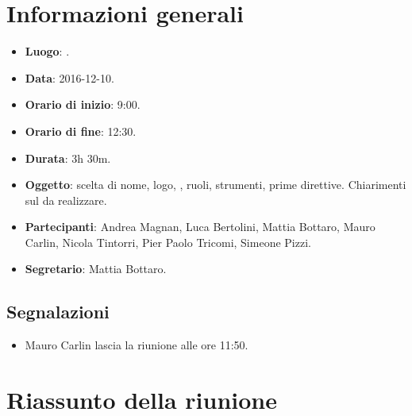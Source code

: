 \documentclass[a4paper,titlepage]{article}
\begin{document}
\maketitle
\begin{diario}
\end{diario}
\newpage
\tableofcontents

\newpage
\section{Informazioni generali}
\label{sec:Informazioni}

\begin{itemize}
  \item \textbf{Luogo}: .
  \item \textbf{Data}: 2016-12-10.
  \item \textbf{Orario di inizio}: 9:00.
  \item \textbf{Orario di fine}: 12:30.
  \item \textbf{Durata}: 3h 30m.
  \item \textbf{Oggetto}: scelta di nome, logo, , ruoli, strumenti, prime direttive. Chiarimenti sul  da realizzare. 
  \item \textbf{Partecipanti}: Andrea Magnan, Luca Bertolini, Mattia Bottaro, Mauro Carlin, Nicola Tintorri, Pier Paolo Tricomi, Simeone Pizzi.
  \item \textbf{Segretario}: Mattia Bottaro.
  
\end{itemize}
\subsection{Segnalazioni}
\begin{itemize}
 \item Mauro Carlin lascia la riunione alle ore 11:50.
\end{itemize}
\section{Riassunto della riunione}
\label{sec:RiassuntoRiunione}
\end{document}
